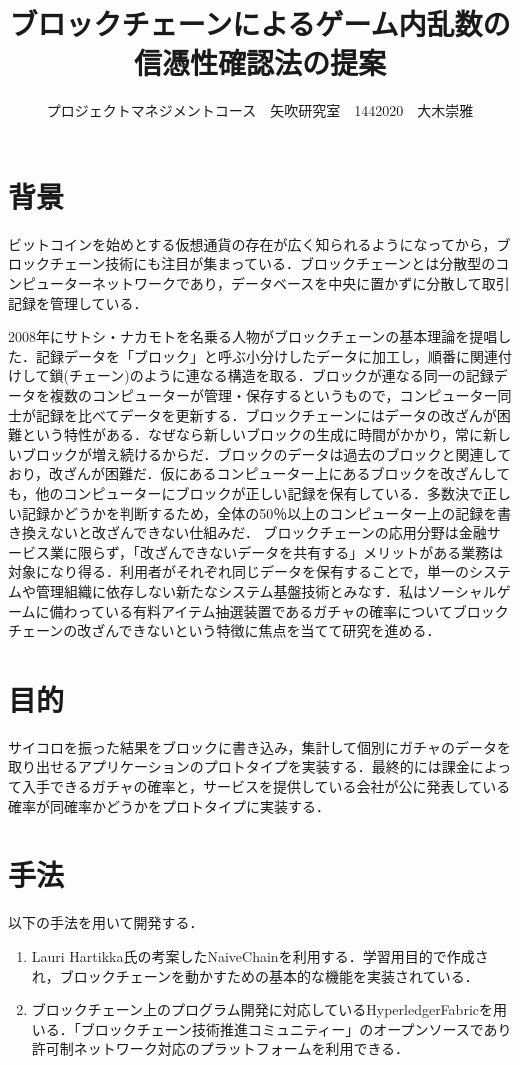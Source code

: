 \documentclass[uplatex,twocolumn,dvipdfmx]{jsarticle}
\title{\vspace{-5mm}\fontsize{14pt}{0pt}\selectfont ブロックチェーンによるゲーム内乱数の信憑性確認法の提案}
\author{\normalsize プロジェクトマネジメントコース　矢吹研究室　1442020　大木崇雅}
\date{}
\begin{document}
\fontsize{10.5pt}{\baselineskip}\selectfont
\maketitle





\section{背景}
ビットコインを始めとする仮想通貨の存在が広く知られるようになってから，ブロックチェーン技術にも注目が集まっている．ブロックチェーンとは分散型のコンピューターネットワークであり，データベースを中央に置かずに分散して取引記録を管理している\cite{a}．

2008年にサトシ・ナカモトを名乗る人物がブロックチェーンの基本理論を提唱した．記録データを「ブロック」と呼ぶ小分けしたデータに加工し，順番に関連付けして鎖(チェーン)のように連なる構造を取る．ブロックが連なる同一の記録データを複数のコンピューターが管理・保存するというもので，コンピューター同士が記録を比べてデータを更新する．ブロックチェーンにはデータの改ざんが困難という特性がある\cite{b}．なぜなら新しいブロックの生成に時間がかかり，常に新しいブロックが増え続けるからだ．ブロックのデータは過去のブロックと関連しており，改ざんが困難だ．仮にあるコンピューター上にあるブロックを改ざんしても，他のコンピューターにブロックが正しい記録を保有している．多数決で正しい記録かどうかを判断するため，全体の50％以上のコンピューター上の記録を書き換えないと改ざんできない仕組みだ\cite{c}．
ブロックチェーンの応用分野は金融サービス業に限らず，「改ざんできないデータを共有する」メリットがある業務は対象になり得る．利用者がそれぞれ同じデータを保有することで，単一のシステムや管理組織に依存しない新たなシステム基盤技術とみなす．私はソーシャルゲームに備わっている有料アイテム抽選装置であるガチャの確率についてブロックチェーンの改ざんできないという特徴に焦点を当てて研究を進める．



\section{目的}
サイコロを振った結果をブロックに書き込み，集計して個別にガチャのデータを取り出せるアプリケーションのプロトタイプを実装する．最終的には課金によって入手できるガチャの確率と，サービスを提供している会社が公に発表している確率が同確率かどうかをプロトタイプに実装する．

\section{手法}
以下の手法を用いて開発する．
\begin{enumerate}
 \item Lauri Hartikka氏の考案したNaiveChainを利用する．学習用目的で作成され，ブロックチェーンを動かすための基本的な機能を実装されている．
 \item ブロックチェーン上のプログラム開発に対応しているHyperledgerFabricを用いる．「ブロックチェーン技術推進コミュニティー」のオープンソースであり許可制ネットワーク対応のプラットフォームを利用できる．
\end{enumerate}
\end{document}
